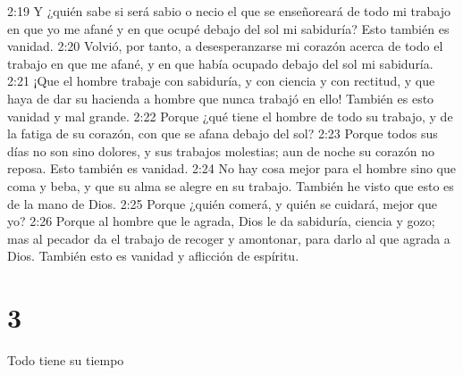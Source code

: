 2:19 Y ¿quién sabe si será sabio o necio el que se enseñoreará de todo mi trabajo en que yo me afané y en que ocupé debajo del sol mi sabiduría? Esto también es vanidad.  
2:20 Volvió, por tanto, a desesperanzarse mi corazón acerca de todo el trabajo en que me afané, y en que había ocupado debajo del sol mi sabiduría.  
2:21 ¡Que el hombre trabaje con sabiduría, y con ciencia y con rectitud, y que haya de dar su hacienda a hombre que nunca trabajó en ello! También es esto vanidad y mal grande.  
2:22 Porque ¿qué tiene el hombre de todo su trabajo, y de la fatiga de su corazón, con que se afana debajo del sol?  
2:23 Porque todos sus días no son sino dolores, y sus trabajos molestias; aun de noche su corazón no reposa. Esto también es vanidad.  
2:24 No hay cosa mejor para el hombre sino que coma y beba, y que su alma se alegre en su trabajo. También he visto que esto es de la mano de Dios.  
2:25 Porque ¿quién comerá, y quién se cuidará, mejor que yo?  
2:26 Porque al hombre que le agrada, Dios le da sabiduría, ciencia y gozo; mas al pecador da el trabajo de recoger y amontonar, para darlo al que agrada a Dios. También esto es vanidad y aflicción de espíritu.  

\chapter{3}

Todo tiene su tiempo  

